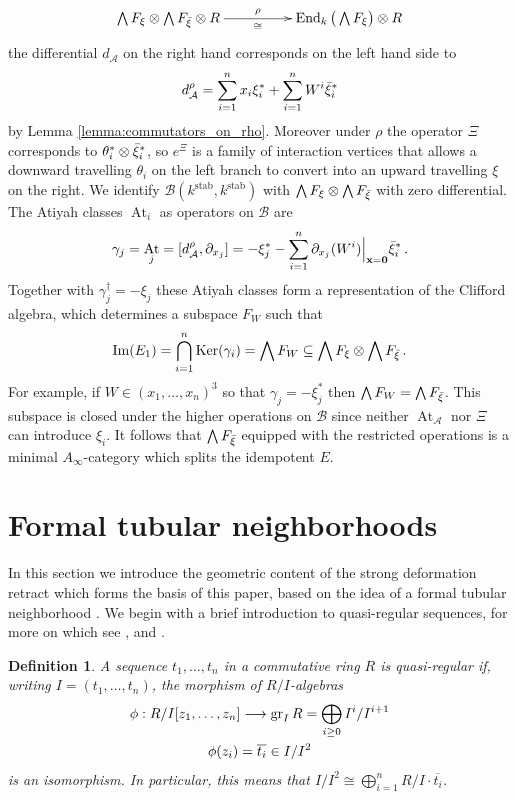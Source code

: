 \documentclass[english,letter paper,12pt,leqno]{article}
\theoremstyle{example}
\newtheorem{definition}[theorem]{Definition}
\numberwithin{equation}{section}
\def\AA{\mathcal{A}}
\def\BB{\mathcal{B}}
\def\Ker{\operatorname{Ker}}
\def\stab{\operatorname{stab}}
\def\be{\begin{equation}}
\def\ee{\end{equation}}
\DeclareMathOperator{\End}{End}
\DeclareMathOperator{\At}{At}
\DeclareMathOperator{\vAt}{At}
\begin{document}
\be\label{eq:rho_now}
\xymatrix@C+2pc{
\bigwedge F_\xi \otimes \bigwedge F_{\Bar{\xi}} \otimes R \ar[r]^-{\rho}_-{\cong} & \End_k\big( \bigwedge F_\xi \big) \otimes R
}
\ee
the differential $d_{\AA}$ on the right hand corresponds on the left hand side to
\be\label{eq:daa_stab}
d^{\rho}_{\AA} = \sum_{i=1}^n x_i \xi_i^* + \sum_{i=1}^n W^i \Bar{\xi}_i^*
\ee
by Lemma \ref{lemma:commutators_on_rho}. Moreover under $\rho$ the operator $\Xi$ corresponds to $\theta_i^* \otimes \Bar{\xi}_i^*$, so $e^{\Xi}$ is a family of interaction vertices that allows a downward travelling $\theta_i$ on the left branch to convert into an upward travelling $\xi$ on the right. We identify $\BB(k^{\stab}, k^{\stab})$ with $\bigwedge F_\xi \otimes \bigwedge F_{\Bar{\xi}}$ with zero differential. The Atiyah classes $\At_i$ as operators on $\BB$ are
\[
\gamma_j = \At_j = [d_{\AA}^{\rho},\partial_{x_j}] = -\xi_j^* - \sum_{i=1}^n \partial_{x_j}(W^i)\Big|_{\bold{x} = \bold{0}} \Bar{\xi}_i^*\,.
\]
Together with $\gamma_j^\dagger = - \xi_j$ these Atiyah classes form a representation of the Clifford algebra, which determines a subspace $F_W$ such that 
\[
\operatorname{Im}(E_1) = \bigcap_{i=1}^n \Ker(\gamma_i) = \bigwedge F_W \subseteq \bigwedge F_\xi \otimes \bigwedge F_{\Bar{\xi}}\,.
\]
For example, if $W \in (x_1,\ldots,x_n)^3$ so that $\gamma_j = - \xi_j^*$ then $\bigwedge F_W = \bigwedge F_{\Bar{\xi}}$. This subspace is closed under the higher operations on $\BB$ since neither $\vAt_{\AA}$ nor $\Xi$ can introduce $\xi_i$. It follows that $\bigwedge F_{\Bar{\xi}}$ equipped with the restricted operations is a minimal $A_\infty$-category which splits the idempotent $E$.%

\appendix

\section{Formal tubular neighborhoods}\label{section:formaltub}

In this section we introduce the geometric content of the strong deformation retract which forms the basis of this paper, based on the idea of a formal tubular neighborhood \cite{cuntzquillen, lipman}. We begin with a brief introduction to quasi-regular sequences, for more on which see \cite[\S 15.B]{matsumura}, \cite[Chapitre $0$ \S 15.1]{EGA4} and \cite[Section\,10.68]{stacks_project}.

\begin{definition} A sequence $t_1,\ldots,t_n$ in a commutative ring $R$ is \emph{quasi-regular} if, writing $I = (t_1,\ldots,t_n)$, the morphism of $R/I$-algebras
\begin{gather*}
\phi: R/I[z_1,\ldots,z_n] \longrightarrow \operatorname{gr}_I R = \bigoplus_{i \ge 0} I^i / I^{i+1}\\
\phi(z_i) = \overline{t_i} \in I/I^2
\end{gather*}
is an isomorphism. In particular, this means that $I/I^2 \cong \bigoplus_{i=1}^n R/I \cdot \overline{t_i}$.
\end{definition}
\end{document}
